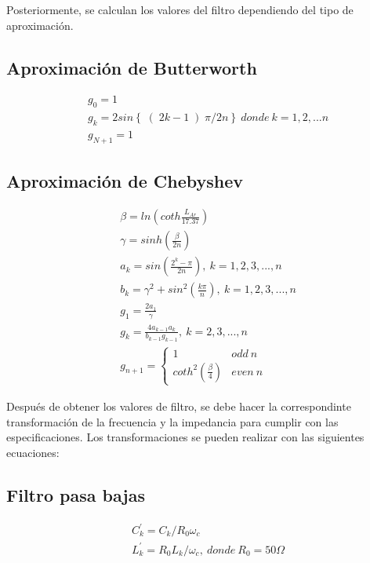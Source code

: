 Posteriormente, se calculan los valores del filtro dependiendo del tipo de aproximación.


\subsection*{Aproximación de Butterworth}
\begin{subequations}
    \begin{align}
        & g_{0} = 1 \\
        & g_{k} = 2 sin\left\{ \right( 2k - 1 \left) \pi / 2n \right\}~donde~k=1,2,...n \\
        & g_{N + 1} = 1
    \end{align}
\end{subequations}


\subsection*{Aproximación de Chebyshev}
\begin{subequations}
    \begin{align}
        & \beta = ln \left( coth \frac{L_{Ar}}{17.37} \right) \\
        & \gamma = sinh \left( \frac{\beta}{2n} \right) \\
        & a_{k} = sin\left( \frac{2^{k} - \pi}{2n} \right),~k=1,2,3,...,n \\
        & b_{k} = \gamma^{2} + sin^{2}\left( \frac{k \pi}{n} \right),~k=1,2,3,...,n \\
        & g_{1} = \frac{2 a_{1}}{\gamma} \\
        & g_{k} = \frac{4 a_{k - 1} a_{k}}{b_{k - 1} g_{k - 1}},~k=2,3,...,n \\
        & g_{n+1} =
        \begin{cases}
            1 & odd~n \\
            coth^2(\frac{\beta}{4}) & even~n
        \end{cases}
    \end{align}
\end{subequations}

Después de obtener los valores de filtro, se debe hacer la correspondinte transformación de la frecuencia y la impedancia para cumplir con las especificaciones. Los transformaciones se pueden realizar con las siguientes ecuaciones:

\subsection*{Filtro pasa bajas}
\begin{subequations}
    \begin{align}
        & C_{k}^{'} = C_{k} / R_{0} \omega_{c} \\
        & L_{k}^{'} = R_{0} L_{k} / \omega_{c},~donde~R_{0} = 50 \Omega
    \end{align}
\end{subequations}


